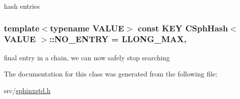 hash entries 

\hypertarget{classCSphHash_ac7c493907a5d923843f40bc427182589}{
\subsubsection[{N\-O\-\_\-\-E\-N\-T\-R\-Y}]{\setlength{\rightskip}{0pt plus 5cm}template$<$typename V\-A\-L\-U\-E$>$ const {\bf K\-E\-Y} {\bf C\-Sph\-Hash}$<$ V\-A\-L\-U\-E $>$\-::N\-O\-\_\-\-E\-N\-T\-R\-Y = {\bf L\-L\-O\-N\-G\-\_\-\-M\-A\-X}\hspace{0.3cm}{\ttfamily [static]}, {\ttfamily [protected]}}}\label{classCSphHash_ac7c493907a5d923843f40bc427182589}


final entry in a chain, we can now safely stop searching 



The documentation for this class was generated from the following file\-:\begin{DoxyCompactItemize}
\item 
src/\hyperlink{sphinxstd_8h}{sphinxstd.\-h}\end{DoxyCompactItemize}
